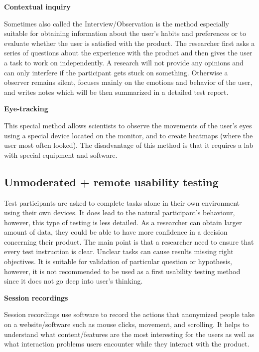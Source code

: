 \documentclass[a4paper,10pt,twoside]{article}
\begin{document}
\smallskip

\noindent \textbf {Contextual inquiry}

\noindent Sometimes also called the Interview/Observation is the method especially suitable for obtaining information about the user's habits and preferences or to evaluate whether the user is satisfied with the product. The researcher first asks a series of questions about the experience with the product and then gives the user a task to work on independently. A research will not provide any opinions and can only interfere if the participant gets stuck on something. Otherwise a observer remains silent,  focuses mainly on the emotions and behavior of the user, and writes notes which will be then summarized in a detailed test report.

\smallskip

\noindent \textbf {Eye-tracking}

\noindent This special method allows scientists to observe the movements of the user's eyes using a special device located on the monitor, and to create heatmaps (where the user most often looked). The disadvantage of this method is that it requires a lab with special equipment and software.

\subsection{Unmoderated + remote usability testing}

Test participants are asked to complete tasks alone in their own environment using their own devices. It does lead to the natural participant's behaviour, however, this type of testing is less detailed. As a researcher can obtain larger amount of data, they could be able to have more confidence in a decision concerning their product. The main point is that a researcher need to ensure that every test instruction is clear. Unclear tasks can cause results missing right objectives. It is suitable for validation of particular question or hypothesis, however, it is not recommended to be used as a first usability testing method since it does not go deep into user’s thinking.

\smallskip

\noindent \textbf {Session recordings}

\noindent Session recordings use software to record the actions that anonymized people take on a website/software such as mouse clicks, movement, and scrolling. It helps to understand what content/features are the most interesting for the users as well as what interaction problems users encounter while they interact with the product.
\smallskip
\end{document}
